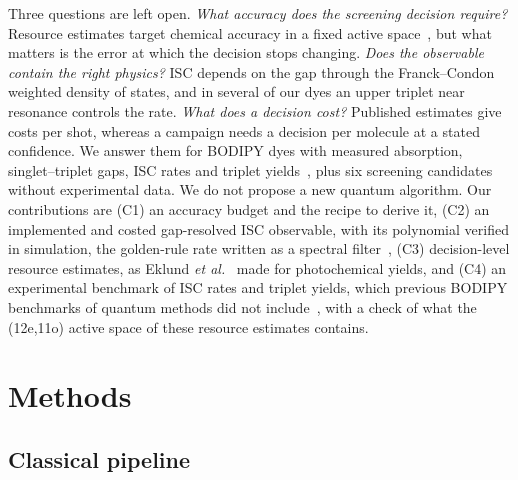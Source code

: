 \documentclass[journal=jctcce,manuscript=article]{achemso}
\begin{document}
Three questions are left open. \emph{What accuracy does the screening decision require?} Resource
estimates target chemical accuracy in a fixed active space~\cite{vonBurg2021,Lee2021}, but what
matters is the error at which the decision stops changing. \emph{Does the observable contain the right
physics?} ISC depends on the gap through the Franck--Condon weighted density of states, and in several of
our dyes an upper triplet near resonance controls the rate. \emph{What does a decision cost?} Published
estimates give costs per shot, whereas a campaign needs a decision per molecule at a stated confidence.
We answer them for BODIPY dyes with measured absorption, singlet--triplet gaps, ISC rates and triplet
yields~\cite{Ly2021}, plus six screening candidates without experimental data. We do not propose a new
quantum algorithm. Our contributions are (C1) an accuracy budget and the recipe to derive it, (C2) an
implemented and costed gap-resolved ISC observable, with its polynomial verified in simulation, the golden-rule rate written as a spectral
filter~\cite{Roggero2020,Rall2020}, (C3) decision-level resource estimates, as Eklund
\emph{et al.}~\cite{Eklund2026} made for photochemical yields, and (C4) an experimental benchmark of ISC
rates and triplet yields, which previous BODIPY benchmarks of quantum methods did not
include~\cite{Nykanen2024,Genin2025}, with a check of what the (12e,11o) active space of these resource
estimates contains.

\section{Methods}

\subsection{Classical pipeline}
\label{sec:pipeline}
\end{document}
